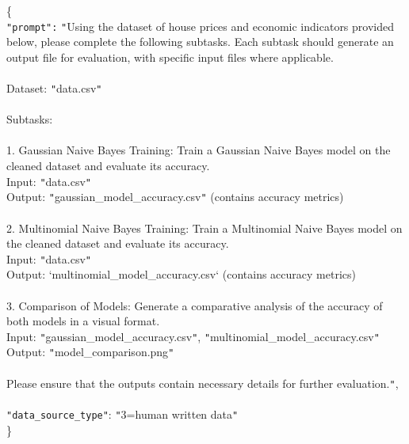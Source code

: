 \begin{tcolorbox}[colback=blue!5!white, colframe=blue!75!black, title=Easy-level Prompt \#2:, text width=\textwidth]
\{ 
\\
    \texttt{"prompt":} \texttt{"}Using the dataset of house prices and economic indicators provided below, please complete the following subtasks. Each subtask should generate an output file for evaluation, with specific input files where applicable.\\ \\ Dataset: \texttt{"}data.csv\texttt{"}\\ \\Subtasks:\\ \\ 1. Gaussian Naive Bayes Training: Train a Gaussian Naive Bayes model on the cleaned dataset and evaluate its accuracy.  \\   Input: \texttt{"}data.csv\texttt{"}  \\   Output: \texttt{"}gaussian\_model\_accuracy.csv\texttt{"} (contains accuracy metrics)\\ \\2. Multinomial Naive Bayes Training: Train a Multinomial Naive Bayes model on the cleaned dataset and evaluate its accuracy.  \\   Input: \texttt{"}data.csv\texttt{"}  \\   Output: `multinomial\_model\_accuracy.csv` (contains accuracy metrics)\\ \\ 3. Comparison of Models: Generate a comparative analysis of the accuracy of both models in a visual format.  \\   Input: \texttt{"}gaussian\_model\_accuracy.csv\texttt{"}, \texttt{"}multinomial\_model\_accuracy.csv\texttt{"}  \\   Output: \texttt{"}model\_comparison.png\texttt{"} \\ \\ Please ensure that the outputs contain necessary details for further evaluation.\texttt{"}, \\ \\
    \texttt{"data\_source\_type"}: \texttt{"}3=human written data\texttt{"}
\\
\}
\end{tcolorbox}